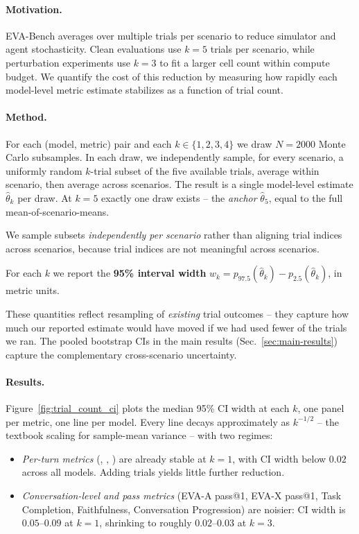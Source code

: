 \paragraph{Motivation.}
EVA-Bench averages over multiple trials per scenario to reduce
simulator and agent stochasticity. Clean evaluations use $k{=}5$
trials per scenario, while perturbation experiments use $k{=}3$ to
fit a larger cell count within compute budget. We quantify the cost of
this reduction by measuring how rapidly each model-level metric
estimate stabilizes as a function of trial count.

\paragraph{Method.}
For each (model, metric) pair and each $k \in \{1,2,3,4\}$ we draw
$N{=}2000$ Monte Carlo subsamples. In each draw, we independently
sample, for every scenario, a uniformly random $k$-trial subset of the
five available trials, average within scenario, then average across
scenarios. The result is a single model-level estimate
$\hat{\theta}_k$ per draw. At $k{=}5$ exactly one draw exists --
the {\em anchor} $\hat{\theta}_5$, equal to the full
mean-of-scenario-means.

We sample subsets {\em independently per scenario} rather than
aligning trial indices across scenarios, because trial indices are not
meaningful across scenarios.

For each $k$ we report the {\bf 95\% interval width}
        $w_k = p_{97.5}(\hat{\theta}_k) - p_{2.5}(\hat{\theta}_k)$,
        in metric units.

These quantities reflect resampling of {\em existing} trial
outcomes -- they capture how much our reported estimate would have
moved if we had used fewer of the trials we ran. The pooled bootstrap CIs in the main results (Sec.~\ref{sec:main-results}) capture the complementary cross-scenario uncertainty.

\paragraph{Results.}
Figure~\ref{fig:trial_count_ci} plots the median 95\% CI width at
each $k$, one panel per metric, one line per model. Every line decays
approximately as $k^{-1/2}$ -- the textbook scaling for sample-mean
variance -- with two regimes:

\begin{itemize}\itemsep0pt
  \item {\em Per-turn metrics} (\metricfidelity, \metricconcise,
        \metricturntaking) are already stable at $k{=}1$, with CI width
        below $0.02$ across all models. Adding trials yields little
        further reduction.
  \item {\em Conversation-level and pass metrics} (EVA-A pass@1, EVA-X pass@1, Task
        Completion, Faithfulness, Conversation Progression) are noisier: CI
        width is $0.05$--$0.09$ at $k{=}1$, shrinking to roughly
        $0.02$--$0.03$ at $k{=}3$.
\end{itemize}

